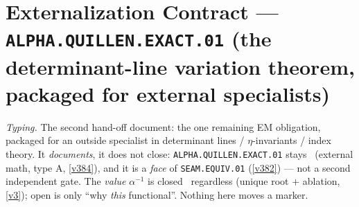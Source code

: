 \documentclass[11pt,a4paper]{article}
\begin{document}
\section*{Externalization Contract --- \texttt{ALPHA.QUILLEN.EXACT.01} (the determinant-line variation theorem, packaged for external specialists)}
\noindent\emph{Typing.} The second hand-off document: the one remaining EM obligation, packaged
for an outside specialist in determinant lines / $\eta$-invariants / index theory. It
\emph{documents}, it does not close: \texttt{ALPHA.QUILLEN.EXACT.01} stays \mO\ (external math,
type A, \vref{v384}), and it is a \emph{face} of \texttt{SEAM.EQUIV.01} (\vref{v382}) --- not a
second independent gate. The \emph{value} $\alpha^{-1}$ is closed \mE\ regardless (unique root
$+$ ablation, \vref{v3}); open is only ``why \emph{this} functional''. Nothing here moves a
marker.
\end{document}

